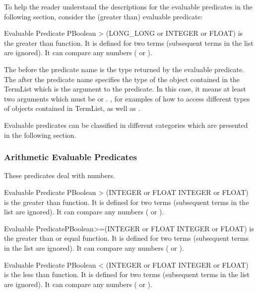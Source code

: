 To help the reader understand the descriptions for the evaluable predicates
in the following section, consider the \code{>} (greater than) evaluable predicate:

\begin{typeep}{Evaluable Predicate} {PBoolean} {>} {(LONG\_LONG or INTEGER or FLOAT)}
is the greater than function. It is defined for two terms (subsequent
terms in the list are ignored). It can compare any numbers ( or
).
\end{typeep}

The  before the predicate name \code{>} is the type returned
by the evaluable predicate.  The 
after the predicate name specifies the type of the object contained in the
TermList which is the argument to the \code{>} predicate. In this case, it
means at least two arguments which must be  or 
.  , for examples of how to access
different types of objects contained in TermList, as well as .

Evaluable predicates can be classified in different categories which are
presented in the following section.



\subsubsection{Arithmetic Evaluable Predicates}

These predicates deal with numbers.

\begin{typeep}{Evaluable Predicate} {PBoolean} {>} {(INTEGER or FLOAT INTEGER or FLOAT)}
is the greater than function. It is defined for two terms (subsequent
terms in the list are ignored). It can compare any numbers ( or
).
\end{typeep}

\begin{typeep}{Evaluable Predicate}{PBoolean}{>=}{(INTEGER or FLOAT INTEGER or FLOAT)}
is the greater than or equal function. It is defined for two terms
(subsequent terms in the list are ignored). It can compare any numbers
( or ).
\end{typeep}

\begin{typeep}{Evaluable Predicate} {PBoolean} {<} {(INTEGER or FLOAT INTEGER or FLOAT)}
is the less than function. It is defined for two terms (subsequent terms
in the list are ignored). It can compare any numbers ( or ).
\end{typeep}

